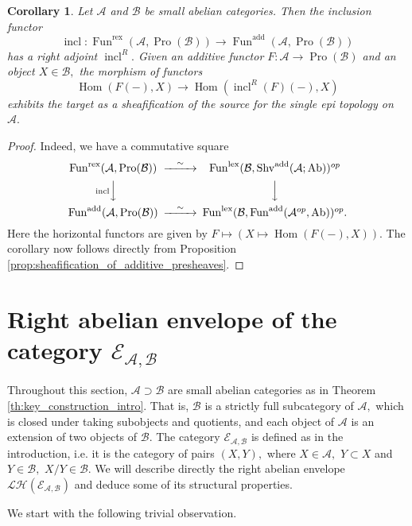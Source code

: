 \documentclass[11pt,leqno]{amsart}
\newtheorem{cor}[theo]{Corollary}
\numberwithin{equation}{section}
\def\Hom{\operatorname{Hom}}
\newcommand{\lex}{\operatorname{lex}}
\newcommand{\rex}{\operatorname{rex}}
\newcommand{\cL}{{\mathcal L}}
\newcommand{\cA}{{\mathcal A}}
\newcommand{\cB}{{\mathcal B}}
\newcommand{\cE}{{\mathcal E}}
\newcommand{\cH}{{\mathcal H}}
\newcommand{\incl}{\operatorname{incl}}
\newcommand{\Fun}{\operatorname{Fun}}
\newcommand{\Ab}{\operatorname{Ab}}
\newcommand{\Shv}{\operatorname{Shv}}
\newcommand{\add}{\operatorname{add}}
\newcommand{\Pro}{\operatorname{Pro}}
\begin{document}
\begin{cor}\label{cor:making_a_functor_right_exact}
Let $\cA$ and $\cB$ be small abelian categories. Then the inclusion functor
\begin{equation*}
\incl:\Fun^{\rex}(\cA,\Pro(\cB))\to \Fun^{\add}(\cA,\Pro(\cB))
\end{equation*}
has a right adjoint $\incl^R.$ Given an additive functor $F:\cA\to\Pro(\cB)$ and an object $X\in\cB,$ the morphism of functors
\begin{equation*}
\Hom(F(-),X)\to \Hom(\incl^R(F)(-),X)
\end{equation*}
exhibits the target as a sheafification of the source for the single epi topology on $\cA.$ 
\end{cor} 

\begin{proof}
Indeed, we have a commutative square
\begin{equation*}
\begin{CD}
\Fun^{\rex}(\cA,\Pro(\cB)) @>{\sim}>> \Fun^{\lex}(\cB,\Shv^{\add}(\cA;\Ab))^{op}\\
@V{\incl}VV @VVV\\
\Fun^{\add}(\cA,\Pro(\cB)) @>{\sim}>> \Fun^{\lex}(\cB,\Fun^{\add}(\cA^{op},\Ab))^{op}.
\end{CD}
\end{equation*}
Here the horizontal functors are given by $F\mapsto (X\mapsto \Hom(F(-),X)).$ The corollary now follows directly from Proposition \ref{prop:sheafification_of_additive_presheaves}.
\end{proof}

\section{Right abelian envelope of the category $\cE_{\cA,\cB}$}
\label{sec:description_of_the_envelope}

Throughout this section, $\cA\supset\cB$ are small abelian categories as in Theorem \ref{th:key_construction_intro}. That is, $\cB$ is a strictly full subcategory of $\cA,$ which is closed under taking subobjects and quotients, and each object of $\cA$ is an extension of two objects of $\cB.$ The category $\cE_{\cA,\cB}$ is defined as in the introduction, i.e. it is the category of pairs $(X,Y),$ where $X\in\cA,$ $Y\subset X$ and $Y\in\cB,$ $X/Y\in\cB.$ We will describe directly the right abelian envelope $\cL\cH(\cE_{\cA,\cB})$ and deduce some of its structural properties.

We start with the following trivial observation.
\end{document}
